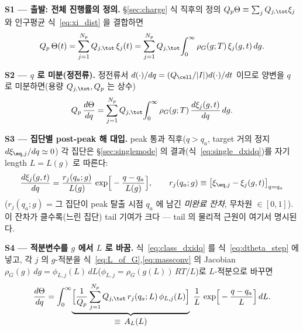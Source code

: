 \textbf{S1 — 출발: 전체 진행률의 정의.} \S\ref{sec:charge} 식 직후의 정의
$Q_p\Theta\equiv\sum_j Q_{j,\tot}\xi_j$ 와 인구평균 식~\eqref{eq:xi_dist} 을 결합하면
\begin{equation}
Q_p\,\Theta(t)=\sum_{j=1}^{N_p}Q_{j,\tot}\,\xi_j(t)
=\sum_{j=1}^{N_p}Q_{j,\tot}\!\int_0^\infty \rho_G(g;T)\,\xi_j(g,t)\,dg.
\label{eq:theta_from_classes}
\end{equation}

\textbf{S2 — $q$ 로 미분(정전류).} 정전류서 $d(\cdot)/dq=(Q_\cell/|I|)d(\cdot)/dt$ 이므로 양변을 $q$ 로
미분하면(용량 $Q_{j,\tot},Q_p$ 는 상수)
\begin{equation}
Q_p\,\frac{d\Theta}{dq}=\sum_{j=1}^{N_p}Q_{j,\tot}\!\int_0^\infty \rho_G(g;T)\,\frac{d\xi_j(g,t)}{dq}\,dg.
\label{eq:dtheta_step}
\end{equation}

\textbf{S3 — 집단별 post-peak 해 대입.} peak 통과 직후($q>q_a$, target 거의 정지 $d\xi_{\eq,j}/dq\simeq0$)
각 집단은 \S\ref{sec:singlemode} 의 결과(식~\eqref{eq:single_dxidq})를 자기 length $L=L(g)$ 로 따른다:
\begin{equation}
\frac{d\xi_j(g,t)}{dq}=\frac{r_j(q_a;g)}{L(g)}\,\exp\!\Big[-\frac{q-q_a}{L(g)}\Big],\qquad
r_j(q_a;g)\equiv\big[\xi_{\eq,j}-\xi_j(g,t)\big]_{q=q_a}
\label{eq:class_dxidq}
\end{equation}
($r_j(q_a;g)$ = 그 집단이 peak 탈출 시점 $q_a$ 에 남긴 \emph{미완료 잔차}, 무차원 $\in[0,1]$). 이 잔차가
클수록(느린 집단) tail 기여가 크다 — tail 의 물리적 근원이 여기서 명시된다.

\textbf{S4 — 적분변수를 $g$ 에서 $L$ 로 바꿈.} 식~\eqref{eq:class_dxidq} 를 식~\eqref{eq:dtheta_step} 에
넣고, 각 $j$ 의 $g$-적분을 식~\eqref{eq:L_of_G},\eqref{eq:massconv} 의 Jacobian
$\rho_G(g)\,dg=\phi_{L,j}(L)\,dL$($\phi_{L,j}=\rho_G(g(L))\,RT/L$)로 $L$-적분으로 바꾸면
\begin{equation}
\frac{d\Theta}{dq}
=\int_0^\infty\!\underbrace{\Big[\frac{1}{Q_p}\sum_{j=1}^{N_p}Q_{j,\tot}\,r_j(q_a;L)\,\phi_{L,j}(L)\Big]}_{\displaystyle \equiv\,A_L(L)}
\;\frac{1}{L}\,\exp\!\Big[-\frac{q-q_a}{L}\Big]\,dL.
\label{eq:tail_derived}
\end{equation}

